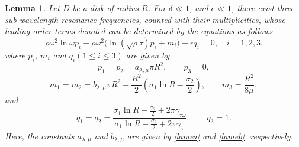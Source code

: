 \documentclass[10pt,reqno,oneside]{amsart}%
\newtheorem{lem}{Lemma}[section]
\theoremstyle{definition}
\theoremstyle{remark}
\numberwithin{equation}{section}
\numberwithin{equation}{section}
\begin{document}
\begin{lem}\label{thmdiskomega}
Let $D$ be a disk of radius $R$. For $\delta\ll 1$, and $\epsilon\ll 1$, there exist three sub-wavelength resonance frequencies,
counted with their multiplicities, whose leading-order terms denoted can be determined by the equations as follows
\begin{equation}\label{formuladisk}
{\rho\omega^2\ln\omega p_{i}+\rho\omega^2\Big(\ln{(\sqrt{\rho}\tau)}p_{i}
+m_{i}\Big)-\epsilon q_{i}=0, \quad i=1,2,3.}%
\end{equation}
where $p_{i}$, $m_{i}$ and $q_{i}(1 \leq i \leq 3)$ are given by
\begin{equation}\label{Peigenvalue}
p_{1}=p_{2}={a}_{\lambda,\mu}\pi R^2, \quad\quad  p_{3}=0,\nonumber
\end{equation}
\begin{equation}\label{Meigenvalue}
m_{1}=m_{2}={b}_{\lambda,\mu}\pi R^2-\frac{R^2}{2}\left(\sigma_{1}\ln{R}-\frac{\sigma_2}{2}\right),\quad\quad m_{3}=\frac{R^2}{8\mu},\nonumber
\end{equation}
and
\begin{equation}\label{Qeigenvalue}
q_{1}=q_{2}=\frac{\sigma_{1}\ln{R}-\frac{\sigma_2}{2}+2\pi \gamma_{\tau\omega}}{\sigma_{1}\ln{R}-\frac{\sigma_2}{2}+2\pi \gamma_{\omega}},  \quad\quad  q_{3}=1.\nonumber
\end{equation}
Here, the constants ${a}_{\lambda,\mu}$ and ${b}_{\lambda,\mu}$ are given by \eqref{lamea} and \eqref{lameb}, respectively.
\end{lem}
\end{document}
